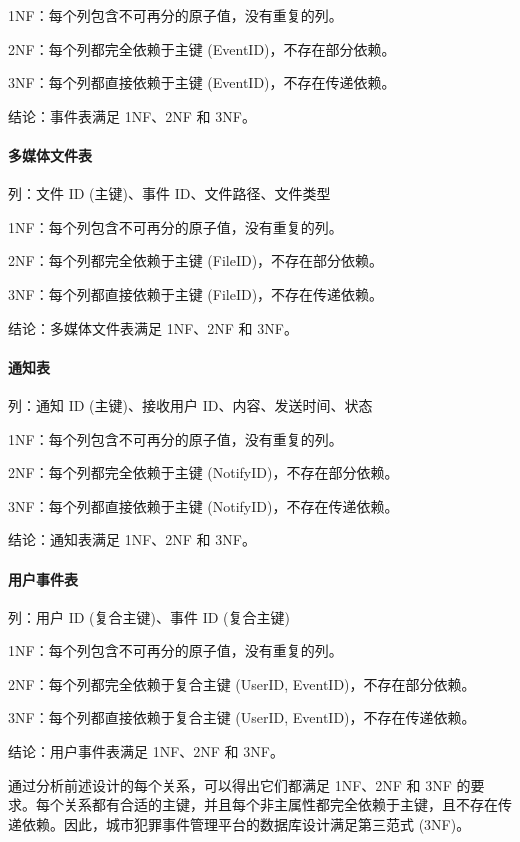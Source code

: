 1NF：每个列包含不可再分的原子值，没有重复的列。

2NF：每个列都完全依赖于主键 (EventID)，不存在部分依赖。

3NF：每个列都直接依赖于主键 (EventID)，不存在传递依赖。

结论：事件表满足 1NF、2NF 和 3NF。

\paragraph{多媒体文件表}

列：文件 ID (主键)、事件 ID、文件路径、文件类型

1NF：每个列包含不可再分的原子值，没有重复的列。

2NF：每个列都完全依赖于主键 (FileID)，不存在部分依赖。

3NF：每个列都直接依赖于主键 (FileID)，不存在传递依赖。

结论：多媒体文件表满足 1NF、2NF 和 3NF。

\paragraph{通知表}

列：通知 ID (主键)、接收用户 ID、内容、发送时间、状态

1NF：每个列包含不可再分的原子值，没有重复的列。

2NF：每个列都完全依赖于主键 (NotifyID)，不存在部分依赖。

3NF：每个列都直接依赖于主键 (NotifyID)，不存在传递依赖。

结论：通知表满足 1NF、2NF 和 3NF。

\paragraph{用户事件表}

列：用户 ID (复合主键)、事件 ID (复合主键)

1NF：每个列包含不可再分的原子值，没有重复的列。

2NF：每个列都完全依赖于复合主键 (UserID, EventID)，不存在部分依赖。

3NF：每个列都直接依赖于复合主键 (UserID, EventID)，不存在传递依赖。

结论：用户事件表满足 1NF、2NF 和 3NF。

通过分析前述设计的每个关系，可以得出它们都满足 1NF、2NF 和 3NF 的要求。每个关系都有合适的主键，并且每个非主属性都完全依赖于主键，且不存在传递依赖。因此，城市犯罪事件管理平台的数据库设计满足第三范式 (3NF)。
